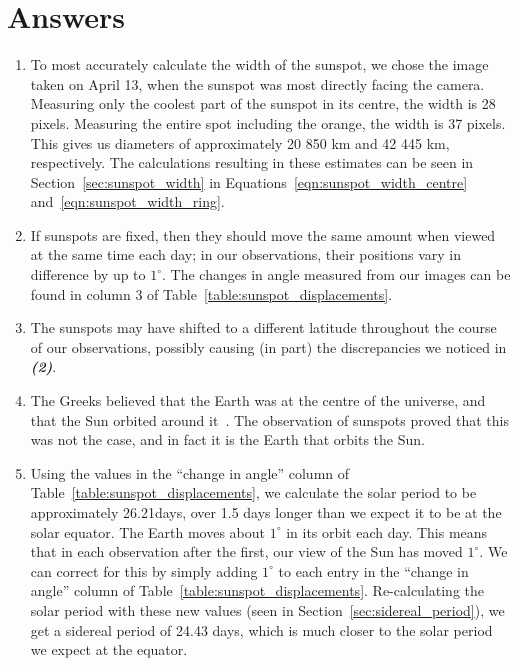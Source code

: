 \documentclass[11pt]{article}
\begin{document}
\section{Answers}
\begin{enumerate}[label={\textbf{\emph{(\arabic*)}}}]
	\item %
To most accurately calculate the width of the sunspot, we chose the image taken on April 13, when the sunspot was most directly facing the camera.
Measuring only the coolest part of the sunspot in its centre, the width is 28 pixels.
Measuring the entire spot including the orange, the width is 37 pixels.
This gives us diameters of approximately 20 850 km and 42 445 km, respectively.
The calculations resulting in these estimates can be seen in Section~\ref{sec:sunspot_width} in Equations~\ref{eqn:sunspot_width_centre} and~\ref{eqn:sunspot_width_ring}.

	\item %
If sunspots are fixed, then they should move the same amount when viewed at the same time each day; in our observations, their positions vary in difference by up to $1^\circ$.
The changes in angle measured from our images can be found in column 3 of Table~\ref{table:sunspot_displacements}.

	\item %
		The sunspots may have shifted to a different latitude throughout the course of our observations, possibly causing (in part) the discrepancies we noticed in \textbf{\emph{(2)}}.

	\item %
The Greeks believed that the Earth was at the centre of the universe, and that the Sun orbited around it~\cite{lecture-slides}.
The observation of sunspots proved that this was not the case, and in fact it is the Earth that orbits the Sun.

	\item %
Using the values in the ``change in angle'' column of Table~\ref{table:sunspot_displacements}, we calculate the solar period to be approximately 26.21days, over 1.5 days longer than we expect it to be at the solar equator.
The Earth moves about $1^\circ$ in its orbit each day.
This means that in each observation after the first, our view of the Sun has moved $1^\circ$.
We can correct for this by simply adding $1^\circ$ to each entry in the ``change in angle'' column of Table~\ref{table:sunspot_displacements}.
Re-calculating the solar period with these new values (seen in Section~\ref{sec:sidereal_period}), we get a sidereal period of 24.43 days, which is much closer to the solar period we expect at the equator.
\end{enumerate}
\end{document}
